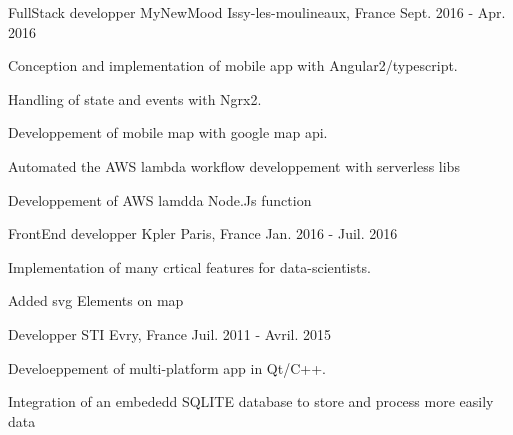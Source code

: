 \begin{cventries}
  \cventry
    {FullStack developper} %
    {MyNewMood} %
    {Issy-les-moulineaux, France} %
    {Sept. 2016 - Apr. 2016} %
    {
      \begin{cvitems} %
        \item {Conception and implementation of mobile app  with Angular2/typescript.}
        \item {Handling of state and events with Ngrx2.}
        \item {Developpement of mobile map with google map api.}
        \item {Automated the AWS lambda workflow developpement with serverless libs}
        \item {Developpement of AWS lamdda Node.Js function}
      \end{cvitems}
    }

  \cventry
    {FrontEnd developper} %
    {Kpler} %
    {Paris, France} %
    {Jan. 2016 - Juil. 2016} %
    {
      \begin{cvitems} %
        \item {Implementation of many crtical features for  data-scientists.}
        \item {Added svg Elements on map}
      \end{cvitems}
    }

  \cventry
    {Developper} %
    {STI} %
    {Evry, France} %
    {Juil. 2011 - Avril. 2015} %
    {
      \begin{cvitems} %
        \item {Develoeppement of multi-platform app in Qt/C++.}
        \item {Integration of an embededd SQLITE database to store and process more easily data}
      \end{cvitems}
    }
\end{cventries}
